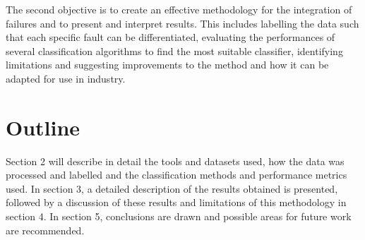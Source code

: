 The second objective is to create an effective methodology for the integration of failures and to present and interpret results. This includes labelling the data such that each specific fault can be differentiated, evaluating the performances of several classification algorithms to find the most suitable classifier, identifying limitations and suggesting improvements to the method and how it can be adapted for use in industry.

\section{Outline}

Section 2 will describe in detail the tools and datasets used, how the data was processed and labelled and the classification methods and performance metrics used. In section 3, a detailed description of the results obtained is presented, followed by a discussion of these results and limitations of this methodology in section 4. In section 5, conclusions are drawn and possible areas for future work are recommended.
